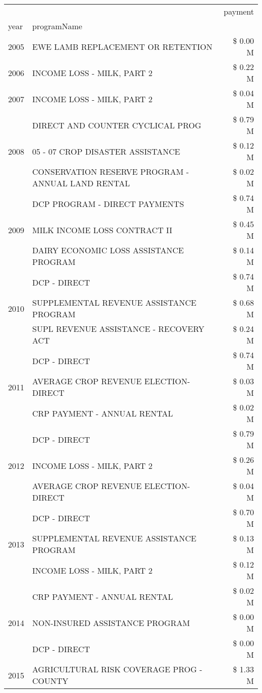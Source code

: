 \begin{tabular}{llr}
\toprule
 &  & payment \\
year & programName &  \\
\midrule
2005 & EWE LAMB REPLACEMENT OR RETENTION & \$ 0.00 M \\
\cline{1-3}
2006 & INCOME LOSS - MILK, PART 2 & \$ 0.22 M \\
\cline{1-3}
2007 & INCOME LOSS - MILK, PART 2 & \$ 0.04 M \\
\cline{1-3}
\multirow[t]{3}{*}{2008} & DIRECT AND COUNTER CYCLICAL PROG & \$ 0.79 M \\
 & 05 - 07 CROP DISASTER ASSISTANCE & \$ 0.12 M \\
 & CONSERVATION RESERVE PROGRAM - ANNUAL LAND RENTAL & \$ 0.02 M \\
\cline{1-3}
\multirow[t]{3}{*}{2009} & DCP PROGRAM - DIRECT PAYMENTS & \$ 0.74 M \\
 & MILK INCOME LOSS CONTRACT II & \$ 0.45 M \\
 & DAIRY ECONOMIC LOSS ASSISTANCE PROGRAM & \$ 0.14 M \\
\cline{1-3}
\multirow[t]{3}{*}{2010} & DCP - DIRECT & \$ 0.74 M \\
 & SUPPLEMENTAL REVENUE ASSISTANCE PROGRAM & \$ 0.68 M \\
 & SUPL REVENUE ASSISTANCE - RECOVERY ACT & \$ 0.24 M \\
\cline{1-3}
\multirow[t]{3}{*}{2011} & DCP - DIRECT & \$ 0.74 M \\
 & AVERAGE CROP REVENUE ELECTION-DIRECT & \$ 0.03 M \\
 & CRP PAYMENT - ANNUAL RENTAL & \$ 0.02 M \\
\cline{1-3}
\multirow[t]{3}{*}{2012} & DCP - DIRECT & \$ 0.79 M \\
 & INCOME LOSS - MILK, PART 2 & \$ 0.26 M \\
 & AVERAGE CROP REVENUE ELECTION-DIRECT & \$ 0.04 M \\
\cline{1-3}
\multirow[t]{3}{*}{2013} & DCP - DIRECT & \$ 0.70 M \\
 & SUPPLEMENTAL REVENUE ASSISTANCE PROGRAM & \$ 0.13 M \\
 & INCOME LOSS - MILK, PART 2 & \$ 0.12 M \\
\cline{1-3}
\multirow[t]{3}{*}{2014} & CRP PAYMENT - ANNUAL RENTAL & \$ 0.02 M \\
 & NON-INSURED ASSISTANCE PROGRAM & \$ 0.00 M \\
 & DCP - DIRECT & \$ 0.00 M \\
\cline{1-3}
\multirow[t]{3}{*}{2015} & AGRICULTURAL RISK COVERAGE PROG - COUNTY & \$ 1.33 M \\

\end{tabular}
